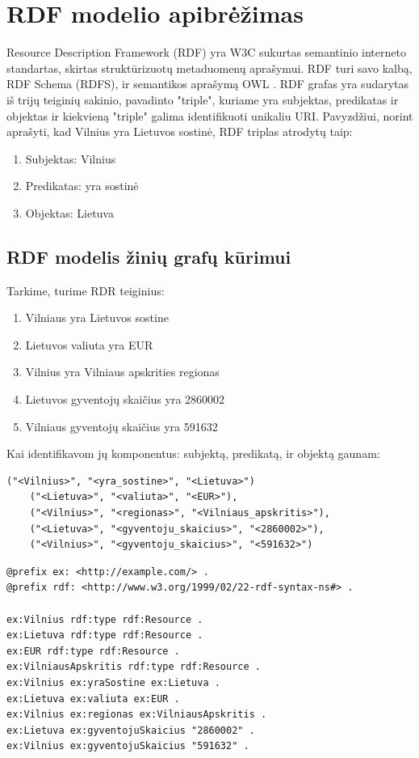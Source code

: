 \documentclass{VUMIFPSkursinis}
\begin{document}
\pagebreak

\section{RDF modelio apibrėžimas}
Resource Description Framework (RDF) yra W3C sukurtas semantinio interneto standartas, skirtas struktūrizuotų metaduomenų aprašymui. RDF turi savo kalbą, RDF Schema (RDFS), ir semantikos aprašymą OWL \cite{wiki:rdf}. RDF grafas yra sudarytas iš trijų teiginių sakinio, pavadinto "triple", kuriame yra subjektas, predikatas ir objektas ir kiekvieną "triple" galima identifikuoti unikaliu URI. Pavyzdžiui, norint aprašyti, kad Vilnius yra Lietuvos sostinė, RDF triplas atrodytų taip:
\begin{enumerate}
    \item Subjektas: Vilnius
    \item Predikatas: yra sostinė
    \item Objektas: Lietuva
\end{enumerate}

\subsection{RDF modelis žinių grafų kūrimui}

Tarkime, turime RDR teiginius:
\begin{enumerate}
    \item Vilniaus yra Lietuvos sostine
    \item Lietuvos valiuta yra EUR
    \item Vilnius yra Vilniaus apskrities regionas
    \item Lietuvos gyventojų skaičius yra 2860002
    \item Vilniaus gyventojų skaičius yra 591632
    
\end{enumerate}

Kai identifikavom jų komponentus: subjektą, predikatą, ir objektą gaunam:
\begin{lstlisting}[captionpos=b, caption=Teiginio subjektas; predikatas ir objektas, label=lst:sparql, basicstyle=\ttfamily,frame=single]
    ("<Vilnius>", "<yra_sostine>", "<Lietuva>")
    ("<Lietuva>", "<valiuta>", "<EUR>"),
    ("<Vilnius>", "<regionas>", "<Vilniaus_apskritis>"),
    ("<Lietuva>", "<gyventoju_skaicius>", "<2860002>"),
    ("<Vilnius>", "<gyventoju_skaicius>", "<591632>")
\end{lstlisting}
\begin{lstlisting}[captionpos=b, caption=Teiginio RDF modelis, label=lst:sparql,
   basicstyle=\ttfamily,frame=single]
@prefix ex: <http://example.com/> .
@prefix rdf: <http://www.w3.org/1999/02/22-rdf-syntax-ns#> .

ex:Vilnius rdf:type rdf:Resource .
ex:Lietuva rdf:type rdf:Resource .
ex:EUR rdf:type rdf:Resource .
ex:VilniausApskritis rdf:type rdf:Resource .
ex:Vilnius ex:yraSostine ex:Lietuva .
ex:Lietuva ex:valiuta ex:EUR .
ex:Vilnius ex:regionas ex:VilniausApskritis .
ex:Lietuva ex:gyventojuSkaicius "2860002" .
ex:Vilnius ex:gyventojuSkaicius "591632" .

\end{lstlisting}
\end{document}
